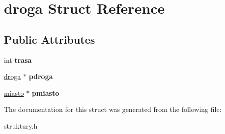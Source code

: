 \hypertarget{structdroga}{}\section{droga Struct Reference}
\label{structdroga}
\subsection*{Public Attributes}
\begin{DoxyCompactItemize}
\item 
\mbox{\label{structdroga_a4788083344d3da2783792f80b35ab524}} 
int {\bfseries trasa}
\item 
\mbox{\label{structdroga_a7ed57ce3de3b4184ba7f7c805964626f}} 
\mbox{\hyperlink{structdroga}{droga}} $\ast$ {\bfseries pdroga}
\item 
\mbox{\label{structdroga_a9c782b9f5281ee0f4cb4581a364b4471}} 
\mbox{\hyperlink{structmiasto}{miasto}} $\ast$ {\bfseries pmiasto}
\end{DoxyCompactItemize}


The documentation for this struct was generated from the following file\+:\begin{DoxyCompactItemize}
\item 
struktury.\+h\end{DoxyCompactItemize}
